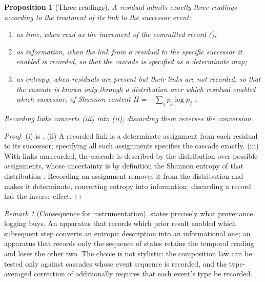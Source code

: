 \documentclass[11pt,a4paper]{article}
\theoremstyle{thmstyle}
\newtheorem{proposition}[theorem]{Proposition}
\theoremstyle{definition}
\theoremstyle{remark}
\newtheorem{remark}[theorem]{Remark}
\begin{document}
\begin{proposition}[Three readings]
\label{prop:three}
A residual admits exactly three readings according to the treatment of its
link to the successor event:
\begin{enumerate}[label=\textup{(\roman*)},leftmargin=2.2em]
\item as \emph{time}, when read as the increment of the committed record
\textup{(}\textup{)};
\item as \emph{information}, when the link from a residual to the specific
successor it enabled is recorded, so that the cascade is specified as a
determinate map;
\item as \emph{entropy}, when residuals are present but their links are not
recorded, so that the cascade is known only through a distribution over
which residual enabled which successor, of Shannon content
$H=-\sum_j p_j\log p_j$ \citep{shannon1948}.
\end{enumerate}
Recording links converts (iii) into (ii); discarding them reverses the
conversion.
\end{proposition}

\begin{proof}
(i) is . (ii) A recorded link is a determinate
assignment from each residual to its successor; specifying all such
assignments specifies the cascade exactly. (iii) With links unrecorded, the
cascade is described by the distribution over possible assignments, whose
uncertainty is by definition the Shannon entropy of that distribution
\citep{shannon1948,cover2006}. Recording an assignment removes it from the
distribution and makes it determinate, converting entropy into information;
discarding a record has the inverse effect.
\end{proof}

\begin{remark}[Consequence for instrumentation]
\label{rem:instrumentation}
 states precisely what provenance logging buys. An
apparatus that records which prior result enabled which subsequent step
converts an entropic description into an informational one; an apparatus
that records only the sequence of states retains the temporal reading and
loses the other two. The choice is not stylistic: the composition law can be
tested only against cascades whose event sequence is recorded, and the
type-averaged correction of  additionally requires
that each event's type be recorded.
\end{remark}
\end{document}
